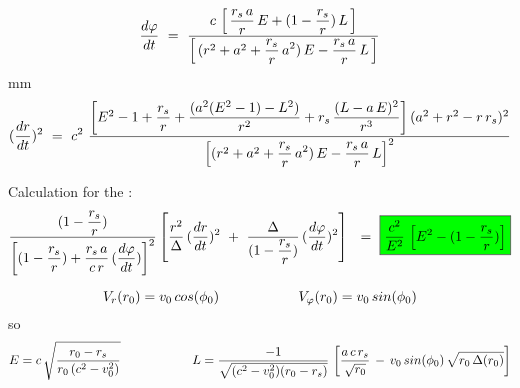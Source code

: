 \documentclass [12pt]{article}
\def\ph#1{\hskip #1}
\def\pv#1{\vskip #1}
\begin{document}
 $$\displaystyle {d\varphi\over dt}\ =\ \displaystyle\frac{c\,\left[\,\displaystyle{r_s\,a\over r}\,E+(1-\displaystyle{r_s\over r})\,L\,\right]}{\left[\,(r^2+a^2+\displaystyle{r_s\over r}\,a^2)\,E-\displaystyle{r_s\,a\over r}\,L\,\right]}$$
\pv 5mm
$$({dr \over dt})^2 \ =\ c^2\ \frac{\left[E^2-1+\displaystyle\frac{r_s}{r}+\displaystyle\frac{(a^2(E^2-1)-L^2)}{r^2}+r_s\,\displaystyle\frac{(L-a\,E)^2}{r^3}\right](a^2+r^2-r\,r_s)^2}{\left[(r^2+a^2+\displaystyle\frac{r_s}{r}\,a^2)\,E-\frac{r_s\,a}{r}\,L\right]^2  }$$ 

Calculation for the  :
$$ \frac{(1-\displaystyle\frac{r_s}{r})}{\left[ (1-\displaystyle\frac{r_s}{r}) + \displaystyle\frac{r_s\,a}{c\,r}\,({d\varphi\over dt}) \right]^2} \left[ \frac{r^2}{\Delta}\,({dr \over dt})^2 \ + \ \displaystyle\frac{\Delta}{(1-\displaystyle\frac{r_s}{r})}\,({d\varphi\over dt})^2 \right]\ 
\ =\ \fcolorbox{black}{green}{$\displaystyle\frac{c^2}{E^2}\,\left[E^2-(1-\displaystyle\frac{r_s}{r})\right]$} $$

\hypertarget{Kerrmassif}{}
  $$V_r(r_0)=v_0\,cos(\phi_0) \ph 20mm  V_\varphi(r_0)=v_0\,sin(\phi_0)$$
  so     
$$E=c\,\sqrt{\frac{r_0-r_s}{r_0\,(c^2-v_0^2)}}  \ph 20mm L=\displaystyle\frac{-1}{\sqrt{(c^2-v_0^2)(r_0-r_s)}}\,\left[\frac{a\,c\,r_s}{\sqrt{r_0}}\,-\,v_0\,sin(\phi_0)\,\sqrt{r_0\,\Delta(r_0)} \right]$$

		
		
		
		
		
		
		
		
		
		
		
		
		
		
		
		
		
		
		
		
		
		
\end{document}
